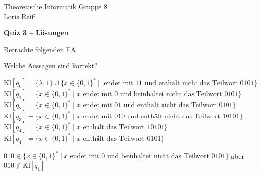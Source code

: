\documentclass[a4paper,ngerman,12pt]{exam}
\begin{document}
\noindent Theoretische Informatik \hfill Gruppe 8 \\
\mbox{}\hfill Loris Reiff
\begin{center}
  \bfseries\Large
  Quiz 3\ifprintanswers
  -- Lösungen
\fi
\end{center}

\begin{questions}
  \question Betrachte folgenden EA.

  \begin{figure}[h]
    \centering
{}
  \end{figure}

  Welche Aussagen sind korrekt?
  \begin{checkboxes}
    \CorrectChoice $\text{Kl}[q_0] = \{\lambda, 1\} \cup \{x \in \{0, 1\}^* \mid
      \text{ endet mit } 11
      \text{ und enthält nicht das Teilwort } 0101\}$
  \choice $\text{Kl}[q_1] = \{x \in \{0, 1\}^* \mid x \text{ endet mit } 0
      \text{ und beinhaltet nicht das Teilwort } 0101\}$
  \CorrectChoice $\text{Kl}[q_2] = \{x \in \{0, 1\}^* \mid x \text{ endet mit } 01
      \text{ und enthält nicht das Teilwort } 0101\}$
  \choice $\text{Kl}[q_3] = \{x \in \{0, 1\}^* \mid x \text{ endet mit } 010
      \text{ und enthält nicht das Teilwort } 10101\} $
  \choice $\text{Kl}[q_4] = \{x \in \{0, 1\}^* \mid
         x \text{ enthält das Teilwort } 10101\}$
  \CorrectChoice $\text{Kl}[q_4] = \{x \in \{0, 1\}^* \mid
         x \text{ enthält das Teilwort } 0101\}$
  \end{checkboxes}
    \begin{solution} $ $\\
      $010 \in \{x \in \{0, 1\}^* \mid x \text{ endet mit } 0
      \text{ und beinhaltet nicht das Teilwort } 0101\}$ aber $010 \not\in \text{Kl}[q_1]$


\end{solution}
\end{questions}
\end{document}
